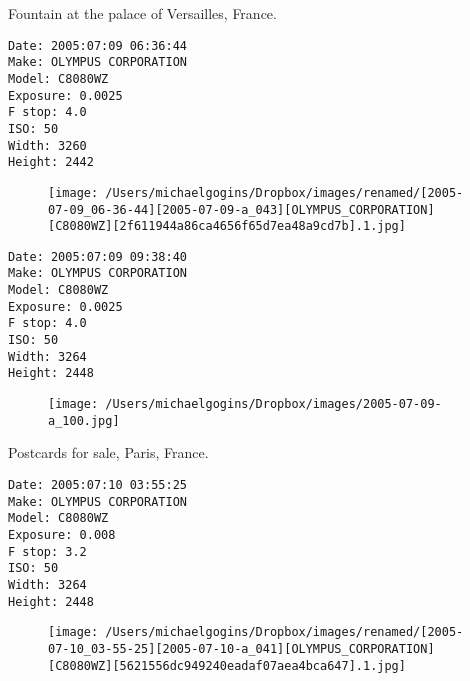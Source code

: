 \documentclass[11pt,letter,DIV=14,paper=landscape]{scrbook}
\begin{document}
\clearpage
\noindent Fountain at the palace of Versailles, France.
\noindent
\begin{lstlisting}
Date: 2005:07:09 06:36:44
Make: OLYMPUS CORPORATION
Model: C8080WZ
Exposure: 0.0025
F stop: 4.0
ISO: 50
Width: 3260
Height: 2442
\end{lstlisting}
\clearpage

\begin{figure}
\texttt{[image: /Users/michaelgogins/Dropbox/images/renamed/[2005-07-09\_06-36-44][2005-07-09-a\_043][OLYMPUS\_CORPORATION][C8080WZ][2f611944a86ca4656f65d7ea48a9cd7b].1.jpg]}
\end{figure}
    
\clearpage
\noindent 
\noindent
\begin{lstlisting}
Date: 2005:07:09 09:38:40
Make: OLYMPUS CORPORATION
Model: C8080WZ
Exposure: 0.0025
F stop: 4.0
ISO: 50
Width: 3264
Height: 2448
\end{lstlisting}
\clearpage

\begin{figure}
\texttt{[image: /Users/michaelgogins/Dropbox/images/2005-07-09-a\_100.jpg]}
\end{figure}
    
\clearpage
\noindent Postcards for sale, Paris, France.
\noindent
\begin{lstlisting}
Date: 2005:07:10 03:55:25
Make: OLYMPUS CORPORATION
Model: C8080WZ
Exposure: 0.008
F stop: 3.2
ISO: 50
Width: 3264
Height: 2448
\end{lstlisting}
\clearpage

\begin{figure}
\texttt{[image: /Users/michaelgogins/Dropbox/images/renamed/[2005-07-10\_03-55-25][2005-07-10-a\_041][OLYMPUS\_CORPORATION][C8080WZ][5621556dc949240eadaf07aea4bca647].1.jpg]}
\end{figure}
    
\end{document}
